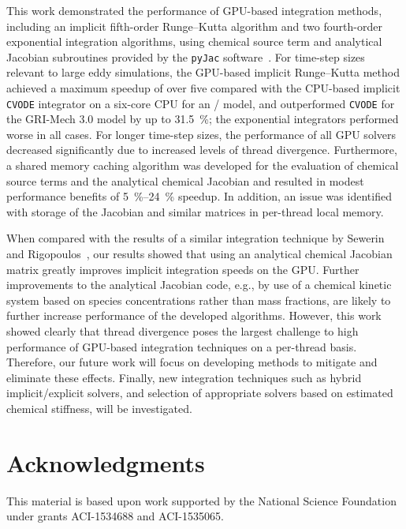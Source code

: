 \documentclass[final,twocolumn]{elsarticle}
\begin{document}
This work demonstrated the performance of GPU-based integration methods, including an implicit fifth-order Runge--Kutta algorithm and two fourth-order exponential integration algorithms, using chemical source term and analytical Jacobian subroutines provided by the \texttt{pyJac} software~\cite{Niemeyer:2015im}.
For time-step sizes relevant to large eddy simulations, the GPU-based implicit Runge--Kutta method achieved a maximum speedup of over five compared with the CPU-based implicit \texttt{CVODE} integrator on a six-core CPU for an \slash{} model, and outperformed \texttt{CVODE} for the GRI-Mech 3.0 model by up to \SI{31.5}{\percent}; the exponential integrators performed worse in all cases.
For longer time-step sizes, the performance of all GPU solvers decreased significantly due to increased levels of thread divergence.
Furthermore, a shared memory caching algorithm was developed for the evaluation of chemical source terms and the analytical chemical Jacobian and resulted in modest performance benefits of \SIrange{5}{24}{\percent} speedup.
In addition, an issue was identified with storage of the Jacobian and similar matrices in per-thread local memory.

When compared with the results of a similar integration technique by Sewerin and Rigopoulos~\cite{Sewerin20151375}, our results showed that using an analytical chemical Jacobian matrix greatly improves implicit integration speeds on the GPU.
Further improvements to the analytical Jacobian code, e.g., by use of a chemical kinetic system based on species concentrations rather than mass fractions, are likely to further increase performance of the developed algorithms.
However, this work showed clearly that thread divergence poses the largest challenge to high performance of GPU-based integration techniques on a per-thread basis.
Therefore, our future work will focus on developing methods to mitigate and eliminate these effects.
Finally, new integration techniques such as hybrid implicit\slash explicit solvers, and selection of appropriate solvers based on estimated chemical stiffness, will be investigated.


\section*{Acknowledgments}
\ifmeasure
\addvspace{10pt}
\fi

This material is based upon work supported by the National Science Foundation under grants ACI-1534688 and ACI-1535065.

\ifmeasure
\footnotesize
\baselineskip 9pt
\setlength{\bibsep}{0pt plus 0.3ex}
\fi


\end{document}
